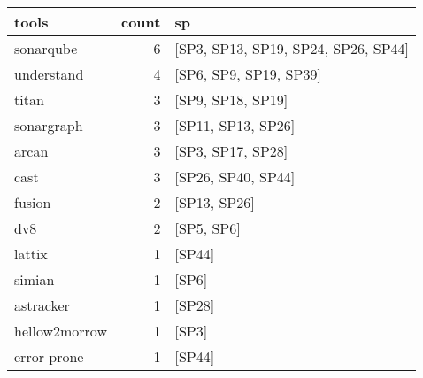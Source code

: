 \begin{tabular}{lrl}
\toprule
               tools &  count &                                                                                                           sp \\
\midrule
           sonarqube &      6 &                                                                          [SP3, SP13, SP19, SP24, SP26, SP44] \\
          understand &      4 &                                                                                       [SP6, SP9, SP19, SP39] \\
               titan &      3 &                                                                                            [SP9, SP18, SP19] \\
          sonargraph &      3 &                                                                                           [SP11, SP13, SP26] \\
               arcan &      3 &                                                                                            [SP3, SP17, SP28] \\
                cast &      3 &                                                                                           [SP26, SP40, SP44] \\
              fusion &      2 &                                                                                                 [SP13, SP26] \\
                 dv8 &      2 &                                                                                                   [SP5, SP6] \\
              lattix &      1 &                                                                                                       [SP44] \\
              simian &      1 &                                                                                                        [SP6] \\
           astracker &      1 &                                                                                                       [SP28] \\
       hellow2morrow &      1 &                                                                                                        [SP3] \\
         error prone &      1 &                                                                                                       [SP44] \\

\end{tabular}
